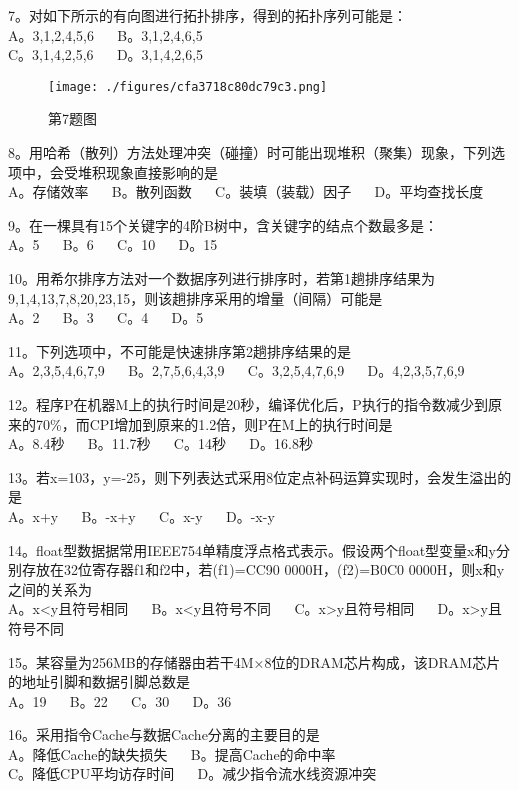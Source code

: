 7。对如下所示的有向图进行拓扑排序，得到的拓扑序列可能是： \\
A。3,1,2,4,5,6 $\quad$ B。3,1,2,4,6,5 \\
C。3,1,4,2,5,6 $\quad$ D。3,1,4,2,6,5
\begin{figure}[ht]
\centering
\texttt{[image: ./figures/cfa3718c80dc79c3.png]}
\caption{第7题图} \label{fig_CSN14_2}
\end{figure}

8。用哈希（散列）方法处理冲突（碰撞）时可能出现堆积（聚集）现象，下列选项中，会受堆积现象直接影响的是 \\
A。存储效率 $\quad$ B。散列函数 $\quad$ C。装填（装载）因子 $\quad$ D。平均查找长度

9。在一棵具有15个关键字的4阶B树中，含关键字的结点个数最多是： \\
A。5 $\quad$ B。6 $\quad$ C。10 $\quad$ D。15

10。用希尔排序方法对一个数据序列进行排序时，若第1趟排序结果为9,1,4,13,7,8,20,23,15，则该趟排序采用的增量（间隔）可能是 \\
A。2 $\quad$ B。3 $\quad$ C。4 $\quad$ D。5

11。下列选项中，不可能是快速排序第2趟排序结果的是 \\
A。2,3,5,4,6,7,9 $\quad$ B。2,7,5,6,4,3,9 $\quad$ C。3,2,5,4,7,6,9 $\quad$ D。4,2,3,5,7,6,9

12。程序P在机器M上的执行时间是20秒，编译优化后，P执行的指令数减少到原来的70\%，而CPI增加到原来的1.2倍，则P在M上的执行时间是 \\
A。8.4秒 $\quad$ B。11.7秒 $\quad$ C。14秒 $\quad$ D。16.8秒

13。若x=103，y=-25，则下列表达式采用8位定点补码运算实现时，会发生溢出的是 \\
A。x+y $\quad$ B。-x+y $\quad$ C。x-y $\quad$ D。-x-y

14。float型数据据常用IEEE754单精度浮点格式表示。假设两个float型变量x和y分别存放在32位寄存器f1和f2中，若(f1)=CC90 0000H，(f2)=B0C0 0000H，则x和y之间的关系为 \\
A。x<y且符号相同 $\quad$ B。x<y且符号不同 $\quad$ C。x>y且符号相同 $\quad$ D。x>y且符号不同

15。某容量为256MB的存储器由若干4M×8位的DRAM芯片构成，该DRAM芯片的地址引脚和数据引脚总数是 \\
A。19 $\quad$ B。22 $\quad$ C。30 $\quad$ D。36

16。采用指令Cache与数据Cache分离的主要目的是 \\
A。降低Cache的缺失损失 $\quad$ B。提高Cache的命中率 \\
C。降低CPU平均访存时间 $\quad$ D。减少指令流水线资源冲突

